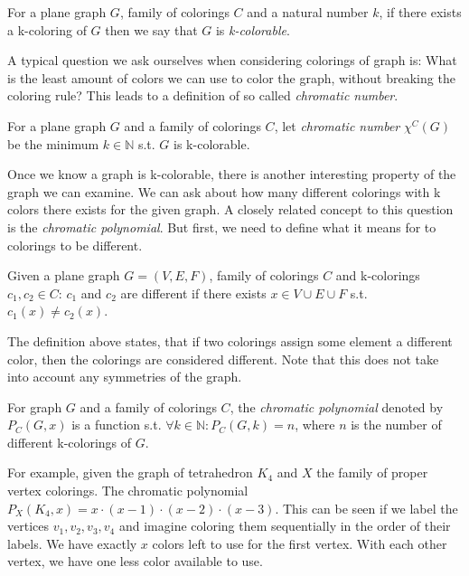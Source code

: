 \begin{definition}
    For a plane graph $G$, family of colorings $C$ and a natural number $k$, if there exists a k-coloring of $G$ then we say that $G$ is \textit{k-colorable}.
\end{definition}

A typical question we ask ourselves when considering colorings of graph is: What is the least amount of colors we can use to color the graph, without breaking the coloring rule? This leads to a definition of so called \textit{chromatic number}. 


\begin{definition}
    For a plane graph $G$ and a family of colorings $C$, let \textit{chromatic number} $\chi ^C (G)$ be the minimum $k \in \mathbb{N}$ s.t. $G$ is k-colorable.
\end{definition}

Once we know a graph is k-colorable, there is another interesting property of the graph we can examine. We can ask about how many different colorings with k colors there exists for the given graph. A closely related concept to this question is the \textit{chromatic polynomial}. But first, we need to define what it means for to colorings to be different.

\begin{definition}
    Given a plane graph $G=(V,E,F)$, family of colorings $C$ and k-colorings $c_1,c_2 \in C$: $c_1$ and $c_2$ are different if there exists $x \in V \cup E \cup F$ s.t. $c_1(x) \neq c_2(x)$.
\end{definition}

The definition above states, that if two colorings assign some element a different color, then the colorings are considered different. Note that this does not take into account any symmetries of the graph.

\begin{definition}
    For graph $G$ and a family of colorings $C$, the \textit{chromatic polynomial} denoted by $P_{C}(G,x)$ is a function s.t. $\forall k \in \mathbb{N} : P_C(G,k) = n$, where $n$ is the number of different k-colorings of $G$.
\end{definition}

For example, given the graph of tetrahedron $K_4$ and $X$ the family of proper vertex colorings. The chromatic polynomial $P_{X}(K_4,x) = x \cdot (x-1) \cdot (x-2) \cdot (x-3)$. This can be seen if we label the vertices $v_1,v_2,v_3,v_4$ and imagine coloring them sequentially in the order of their labels. We have exactly $x$ colors left to use for the first vertex. With each other vertex, we have one less color available to use. 

